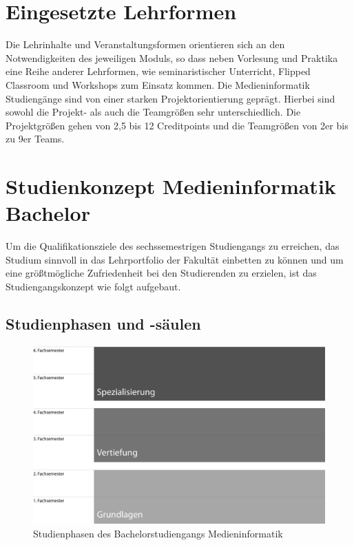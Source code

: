 \section{Eingesetzte Lehrformen}\label{eingesetzte-lehrformen}

Die Lehrinhalte und Veranstaltungsformen orientieren sich an den
Notwendigkeiten des jeweiligen Moduls, so dass neben Vorlesung und
Praktika eine Reihe anderer Lehrformen, wie seminaristischer Unterricht,
Flipped Classroom und Workshops zum Einsatz kommen. Die Medieninformatik
Studiengänge sind von einer starken Projektorientierung geprägt. Hierbei
sind sowohl die Projekt- als auch die Teamgrößen sehr unterschiedlich.
Die Projektgrößen gehen von 2,5 bis 12 Creditpoints und die Teamgrößen
von 2er bis zu 9er Teams.

\section{Studienkonzept Medieninformatik
Bachelor}\label{studienkonzept-medieninformatik-bachelor}

Um die Qualifikationsziele des sechssemestrigen Studiengangs zu
erreichen, das Studium sinnvoll in das Lehrportfolio der Fakultät
einbetten zu können und um eine größtmögliche Zufriedenheit bei den
Studierenden zu erzielen, ist das Studiengangskonzept wie folgt
aufgebaut.

\subsection{Studienphasen und
-säulen}\label{studienphasen-und--suxe4ulen}

\begin{figure}[htbp]
\centering
\includegraphics[width=\columnwidth]{../anhaenge/bilder/ba-studienphasen.png}
\caption{Studienphasen des Bachelorstudiengangs Medieninformatik}
\end{figure}

